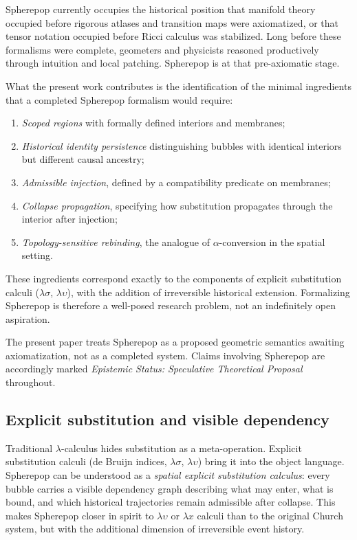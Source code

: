 \documentclass[12pt, a4paper]{article}
\theoremstyle{plain}
\theoremstyle{definition}
\theoremstyle{remark}
\begin{document}
Spherepop currently occupies the historical position that manifold
theory occupied before rigorous atlases and transition maps were
axiomatized, or that tensor notation occupied before Ricci calculus was
stabilized.
Long before these formalisms were complete, geometers and physicists
reasoned productively through intuition and local patching.
Spherepop is at that pre-axiomatic stage.

What the present work contributes is the identification of the minimal
ingredients that a completed Spherepop formalism would require:
\begin{enumerate}
  \item \emph{Scoped regions} with formally defined interiors and
        membranes;
  \item \emph{Historical identity persistence} distinguishing bubbles
        with identical interiors but different causal ancestry;
  \item \emph{Admissible injection}, defined by a compatibility
        predicate on membranes;
  \item \emph{Collapse propagation}, specifying how substitution
        propagates through the interior after injection;
  \item \emph{Topology-sensitive rebinding}, the analogue of
        $\alpha$-conversion in the spatial setting.
\end{enumerate}
These ingredients correspond exactly to the components of explicit
substitution calculi ($\lambda\sigma$, $\lambda\upsilon$), with the
addition of irreversible historical extension.
Formalizing Spherepop is therefore a well-posed research problem,
not an indefinitely open aspiration.

The present paper treats Spherepop as a proposed geometric semantics
awaiting axiomatization, not as a completed system.
Claims involving Spherepop are accordingly marked
\emph{Epistemic Status: Speculative Theoretical Proposal} throughout.

\subsection{Explicit substitution and visible dependency}

Traditional $\lambda$-calculus hides substitution as a meta-operation.
Explicit substitution calculi (de Bruijn indices, $\lambda\sigma$, $\lambda\upsilon$)
bring it into the object language.
Spherepop can be understood as a \emph{spatial explicit substitution calculus}:
every bubble carries a visible dependency graph describing what may enter,
what is bound, and which historical trajectories remain admissible
after collapse.
This makes Spherepop closer in spirit to
$\lambda\upsilon$ or $\lambda x$ calculi than to the original Church system,
but with the additional dimension of irreversible event history.
\end{document}
